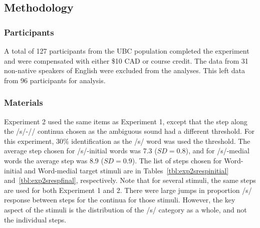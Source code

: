 \subsection{Methodology}

\subsubsection{Participants}

A total of 127 participants from the UBC population completed the experiment and were compensated with either \$10 CAD or course credit.  
The data from 31 non-native speakers of English were excluded from the analyses.
This left data from 96 participants for analysis.

\subsubsection{Materials}

Experiment 2 used the same items as Experiment 1, except that the step along the /s/-/\textesh/ continua chosen as the ambiguous sound had a different threshold.  
For this experiment, 30\% identification as the /s/ word was used the threshold. The average step chosen for /s/-initial words was 7.3 ($SD = 0.8$), and for /s/-medial words the average step was 8.9 ($SD = 0.9$).  
The list of steps chosen for Word-initial and Word-medial target stimuli are in Tables~\ref{tbl:exp2srespinitial} and~\ref{tbl:exp2srespfinal}, respectively.  
Note that for several stimuli, the same steps are used for both Experiment 1 and 2.
There were large jumps in proportion /s/ response between steps for the continua for those stimuli.
However, the key aspect of the stimuli is the distribution of the /s/ category as a whole, and not the individual steps.

